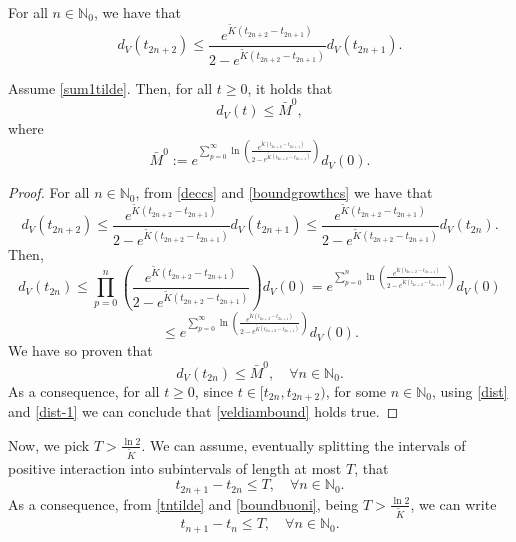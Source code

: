 \documentclass[a4paper,11pt,oneside]{article}
\begin{document}
\begin{lem}
	For all $n\in \mathbb{N}_{0}$, we have that
	\begin{equation}\label{boundgrowthcs}
		d_{V}(t_{2n+2})\leq \frac{e^{\tilde K(t_{2n+2}-t_{2n+1})}}{2-e^{\tilde K(t_{2n+2}-t_{2n+1})}}d_{V}(t_{2n+1}).
	\end{equation}
\end{lem} 
\begin{prop}
	Assume \eqref{sum1tilde}. Then, for all $t\geq 0$, it holds that
	\begin{equation}\label{veldiambound}
		d_{V}(t)\leq \bar{M}^{0}, 
	\end{equation}
where
\begin{equation}\label{boundunifcs}
	\bar{M}^{0}:=e^{\sum_{p=0}^{\infty}\ln \left(\frac{e^{\tilde K(t_{2n+2}-t_{2n+1})}}{2-e^{\tilde K(t_{2n+2}-t_{2n+1})}}\right)}d_{V}(0).
\end{equation}
\end{prop}	
\begin{proof}
For all $n\in \mathbb{N}_{0}$, from \eqref{deccs} and \eqref{boundgrowthcs} we have that
	$$d_{V}(t_{2n+2})\leq \frac{e^{\tilde K(t_{2n+2}-t_{2n+1})}}{2-e^{\tilde K(t_{2n+2}-t_{2n+1})}}d_{V}(t_{2n+1})\leq \frac{e^{\tilde K(t_{2n+2}-t_{2n+1})}}{2-e^{\tilde K(t_{2n+2}-t_{2n+1})}}d_{V}(t_{2n}).$$
	Then, $$d_{V}(t_{2n})\leq \prod_{p=0}^{n}\left(\frac{e^{\tilde K(t_{2n+2}-t_{2n+1})}}{2-e^{\tilde K(t_{2n+2}-t_{2n+1})}}\right)d_{V}(0)=e^{\sum_{p=0}^{n}\ln \left(\frac{e^{\tilde K(t_{2n+2}-t_{2n+1})}}{2-e^{\tilde K(t_{2n+2}-t_{2n+1})}}\right)}d_{V}(0)$$$$\leq e^{\sum_{p=0}^{\infty}\ln \left(\frac{e^{\tilde K(t_{2n+2}-t_{2n+1})}}{2-e^{\tilde K(t_{2n+2}-t_{2n+1})}}\right)}d_{V}(0).$$
	We have so proven that
	\begin{equation}
		d_{V}(t_{2n})\leq \bar{M}^{0},\quad \forall n \in \mathbb{N}_{0}.
	\end{equation}
	As a consequence, for all $t\geq 0$, since $t\in [t_{2n},t_{2n+2})$, for some $n\in \mathbb{N}_{0}$, using \eqref{dist} and \eqref{dist-1} we can conclude that \eqref{veldiambound} holds true.
	\end{proof}

Now, we pick $T> \frac{\ln 2}{\tilde K}$. We can assume, eventually splitting the intervals of positive interaction into subintervals of length at most $T$, that
\begin{equation}\label{boundbuoni}
	t_{2n+1}-t_{2n}\leq T,\quad \forall n\in \mathbb{N}_0.
\end{equation}
As a consequence, from \eqref{tntilde} and \eqref{boundbuoni}, being $T> \frac{\ln 2}{\tilde K}$, we can write 
\begin{equation}\label{boundbc}
	t_{n+1}-t_{n}\leq T,\quad \forall n\in \mathbb{N}_0.
\end{equation} 
\end{document}
